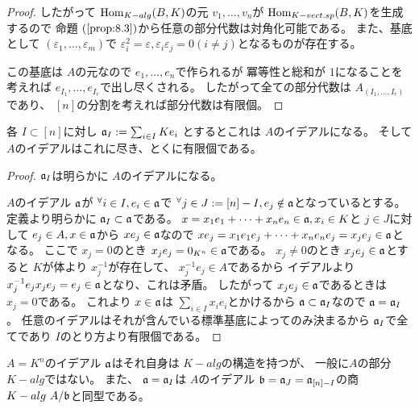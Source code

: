 \documentclass[../master_galois_theory]{subfiles}
\begin{document}
\begin{proof}
  したがって $\mathrm{Hom}_{K-alg}(B,K)$の元 $v_1 , \dots , v_n$が
  $\mathrm{Hom}_{K-vect.sp}(B,K)$を生成するので
  命題 $(\mathrm{\ref{prop:8.3}})$から任意の部分代数は対角化可能である。
  また、基底として $(\varepsilon_1 , \dots , \varepsilon_m)$で
  $\varepsilon_i^2 = \varepsilon , \varepsilon_i \varepsilon_j = 0 (i \neq j)$となるものが存在する。

  この基底は $A$の元なので $e_1 , \dots , e_n$で作られるが
  冪等性と総和が $1$になることを考えれば $e_{I_1} , \dots , e_{I_r}$で出し尽くされる。
  したがって全ての部分代数は $A_{(I_1 , \dots , I_r)}$であり、
  $[n]$の分割を考えれば部分代数は有限個。
\end{proof}

\begin{prop} \label{prop:ideal}
  各 $I \subset [n]$に対し
  $\mathfrak{a}_I := \sum_{i \in I}K e_i$
  とするとこれは $A$のイデアルになる。
  そして $A$のイデアルはこれに尽き、とくに有限個である。
\end{prop}

\begin{proof}
  $\mathfrak{a}_I$は明らかに $A$のイデアルになる。

  $A$のイデアル $\mathfrak{a}$が ${}^\forall i \in I , e_i \in \mathfrak{a}$で
  ${}^\forall j \in J := [n] - I , e_j \notin \mathfrak{a}$となっているとする。
  定義より明らかに $\mathfrak{a}_I \subset \mathfrak{a}$である。
  $x = x_1 e_1 + \cdots + x_n e_n \in \mathfrak{a} , x_i \in K$と
  $j \in J$に対して
  $e_j \in A , x \in \mathfrak{a}$から $x e_j \in \mathfrak{a}$なので
  $x e_j = x_1 e_1 e_j + \cdots + x_n e_n e_j = x_j e_j \in \mathfrak{a}$となる。
  ここで $x_j = 0$のとき $x_j e_j = 0_{K^n} \in \mathfrak{a}$である。
  $x_j \neq 0$のとき $x_j e_j \in \mathfrak{a}$とすると
  $K$が体より $x_j^{-1}$が存在して、 $x_j^{-1} e_j \in A$であるから
  イデアルより $x_j^{-1} e_j x_j e_j = e_j \in \mathfrak{a}$となり、これは矛盾。
  したがって $x_j e_j \in \mathfrak{a}$であるときは $x_j = 0$である。
  これより $x \in \mathfrak{a}$は $\sum_{i \in I} x_i e_i$とかけるから
  $\mathfrak{a} \subset \mathfrak{a}_I$なので $\mathfrak{a} = \mathfrak{a}_I$。
  任意のイデアルはそれが含んでいる標準基底によってのみ決まるから
  $\mathfrak{a}_I$で全てであり $I$のとり方より有限個である。
\end{proof}

\begin{rem} \label{rem:quotientalgebra}
  $A = K^n$のイデアル $\mathfrak{a}$はそれ自身は $K-alg$の構造を持つが、
  一般に$A$の部分 $K-alg$ではない。
  また、 $\mathfrak{a} = \mathfrak{a}_I$は $A$のイデアル $\mathfrak{b} = \mathfrak{a}_J = \mathfrak{a}_{[n] - I}$の商 $K-alg \  A/\mathfrak{b}$と同型である。
\end{rem}
\end{document}
